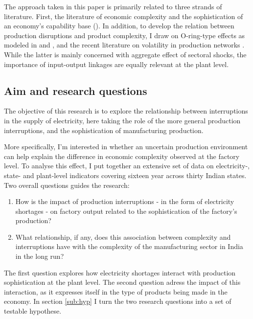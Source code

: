 \documentclass[11pt]{article}
\begin{document}
The approach taken in this paper is primarily related to three strands of literature. First, the literature of economic complexity and the sophistication of an economy's capability base  (\citealp{frenken_related_2007,hausmann_atlas_2013,tacchella_new_2012}). In addition, to develop the relation between production disruptions and product complexity, I draw on O-ring-type effects as modeled in \cite{kremer_o-ring_1993} and \cite{jones_intermediate_2011}, and the recent literature on volatility in production networks \citep{acemoglu_network_2012}. While the latter is mainly concerned with aggregate effect of sectoral shocks, the importance of input-output linkages are equally relevant at the plant level.

\subsection{Aim and research questions}%
\label{sub:aim_and_research_questions}
The objective of this research is to explore the relationship between interruptions in the supply of electricity, here taking the role of the more general production interruptions, and the sophistication of manufacturing production.

More specifically, I'm interested in whether an uncertain production environment can help explain the difference in economic complexity observed at the factory level. To analyse this effect, I put together an extensive set of data on electricity-, state- and plant-level indicators covering sixteen year across thirty Indian states. Two overall questions guides the research: 

\begin{enumerate}

\item How is the impact of production interruptions - in the form of electricity shortages - on factory output related to the sophistication of the factory's production?

\item What relationship, if any, does this association between complexity and interruptions have with the complexity of the manufacturing sector in India in the long run?

\end{enumerate}

The first question explores how electricity shortages interact with production sophistication at the plant level. The second question adress the impact of this interaction, as it expresses itself in the type of products being made in the economy. In section \ref{sub:hyp} I turn the two research questions into a set of testable hypothese.
\end{document}
